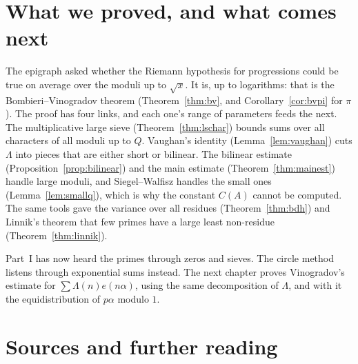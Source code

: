 \section{What we proved, and what comes next}

The epigraph asked whether the Riemann hypothesis for progressions could be true on average over the moduli up to $\sqrt x$. It is, up to logarithms: that is the Bombieri--Vinogradov theorem (Theorem~\ref{thm:bv}, and Corollary~\ref{cor:bvpi} for $\pi$). The proof has four links, and each one's range of parameters feeds the next. The multiplicative large sieve (Theorem~\ref{thm:lschar}) bounds sums over all characters of all moduli up to $Q$. Vaughan's identity (Lemma~\ref{lem:vaughan}) cuts $\Lambda$ into pieces that are either short or bilinear. The bilinear estimate (Proposition~\ref{prop:bilinear}) and the main estimate (Theorem~\ref{thm:mainest}) handle large moduli, and Siegel--Walfisz handles the small ones (Lemma~\ref{lem:smallq}), which is why the constant $C(A)$ cannot be computed. The same tools gave the variance over all residues (Theorem~\ref{thm:bdh}) and Linnik's theorem that few primes have a large least non-residue (Theorem~\ref{thm:linnik}).

Part~I has now heard the primes through zeros and sieves. The circle method listens through exponential sums instead. The next chapter proves Vinogradov's estimate for $\sum\Lambda(n)e(n\alpha)$, using the same decomposition of $\Lambda$, and with it the equidistribution of $p\alpha$ modulo $1$.

\section*{Sources and further reading}

